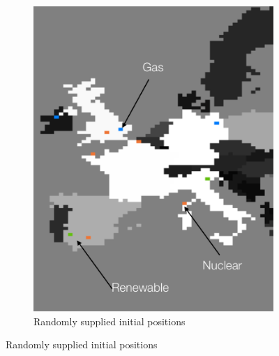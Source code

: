 \documentclass[12pt]{article}
\begin{document}
\begin{figure}[ht!]
	\centering
	\begin{subfigure}{.5\textwidth}
		\centering
		\includegraphics[scale=.4]{movement_before.png}
		\caption{Randomly supplied initial positions}

	\end{subfigure}


\end{figure}
\end{document}
